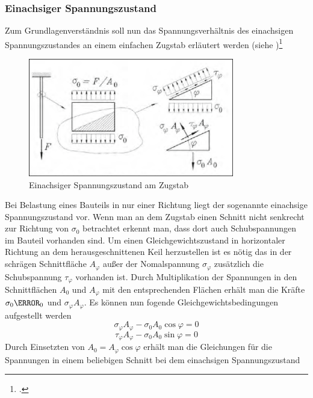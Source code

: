 \documentclass[12pt,a4paper,parskip]{scrartcl}
\begin{document}
{\subsubsection{Einachsiger Spannungszustand}
Zum Grundlagenverständnis soll nun das Spannungsverhältnis des einachsigen Spannungszustandes an einem einfachen Zugstab erläutert werden (siehe )\footcite[Vgl.][388]{dd}\begin{figure}
\centering
\includegraphics[width=0.8\textwidth]{einachsspann}
\caption{Einachsiger Spannungszustand am Zugstab}
\label{fig:einachsspann} 
\end{figure}
Bei Belastung eines Bauteils in nur einer Richtung liegt der sogenannte einachsige Spannungszustand vor. Wenn man an dem Zugstab  einen Schnitt nicht senkrecht zur Richtung von $ \sigma_0 $ betrachtet erkennt man, dass dort auch Schubspannungen im Bauteil vorhanden sind. Um einen Gleichgewichtszustand in horizontaler Richtung an dem herausgeschnittenen Keil herzustellen ist es nötig das in der schrägen Schnittfläche $ A_{\varphi} $ außer der Nomalspannung $ \sigma_{\varphi} $ zusätzlich die Schubspannung $ \tau_{\varphi} $ vorhanden ist. Durch Multiplikation der Spannungen in den Schnittflächen $ A_0 $ und $ A_{\varphi} $ mit den entsprechenden Flächen erhält man die Kräfte $ \sigma_0 \A_0 $ und $ \sigma_{\varphi} A_{\varphi} $. Es können nun fogende Gleichgewichtsbedingungen aufgestellt werden \begin{equation}
\sigma_{\varphi}A_{\varphi} - \sigma_0 A_0\cos{\varphi} = 0  
\end{equation}
\begin{equation}
\tau_{\varphi}A_{\varphi} - \sigma_0A_0\sin{\varphi} = 0
\end{equation} Durch Einsetzten von $ A_0 = A_{\varphi}\cos{\varphi}$ erhält man die Gleichungen für die Spannungen in einem beliebigen Schnitt bei dem einachsigen Spannungszustand
\begin{equation}

\end{equation}}
\end{document}
